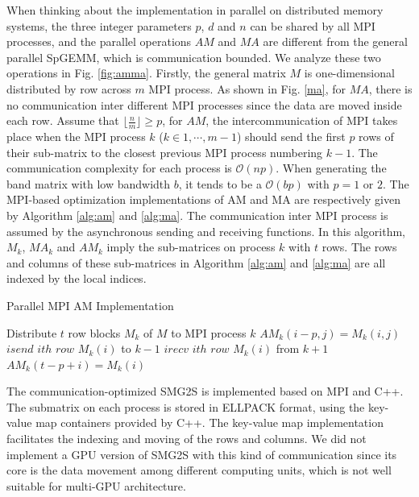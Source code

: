 When thinking about the implementation in parallel on distributed memory systems, the three integer parameters $p$, $d$ and $n$ can be shared by all MPI processes, and the parallel operations $AM$ and $MA$ are different from the general parallel SpGEMM, which is communication bounded. We analyze these two operations in Fig. \ref{fig:amma}. Firstly, the general matrix $M$  is one-dimensional distributed by row across $m$ MPI process. As shown in  Fig. \ref{ma}, for $MA$, there is no communication inter different MPI processes since the data are moved inside each row. Assume that $ \lfloor \frac{n}{m}\rfloor \geq p$, for $AM$, the intercommunication of MPI takes place when the MPI process $k$ ($k \in 1, \cdots, m-1$) should send the first $p$ rows of their sub-matrix to the closest previous MPI process numbering $k-1$. The communication complexity for each process is $\mathcal{O}(np)$. When generating the band matrix with low bandwidth $b$, it tends to be a $\mathcal{O}(bp)$ with $p=1$ or $2$. The MPI-based optimization implementations of AM and MA are respectively given by Algorithm \ref{alg:am} and \ref{alg:ma}. The communication inter MPI process is assumed by the asynchronous sending and receiving functions. In this algorithm, $M_k$, $MA_k$ and $AM_k$ imply the sub-matrices on process $k$ with $t$ rows. The rows and columns of these sub-matrices in Algorithm \ref{alg:am} and \ref{alg:ma} are all indexed by the local indices.

\begin{algorithm}[t]{}
	\caption{Parallel MPI AM Implementation}   
	\label{alg:am}   
	\begin{algorithmic}[1]
		\State Distribute $t$ row blocks $M_k$ of $M$ to MPI process $k$
		\State $AM_k(i-p,j) = M_k(i,j)$
		\EndIf
		\EndFor
		\EndFor
		\State $isend$ $ith$ $row$ $M_k(i)$ to $k-1$
		\EndIf
		\State $irecv$ $ith$ $row$ $M_k(i)$ from $k+1$
		\State $AM_k(t-p+i)=M_k(i)$
		\EndIf
		\EndFor
		\EndFunction
		
	\end{algorithmic}  
	
\end{algorithm}

The communication-optimized SMG2S is implemented based on MPI and C++. The submatrix on each process is stored in ELLPACK format, using the key-value map containers provided by C++. The key-value map implementation facilitates the indexing and moving of the rows and columns. We did not implement a GPU version of SMG2S with this kind of communication since its core is the data movement among different computing units, which is not well suitable for multi-GPU architecture.


